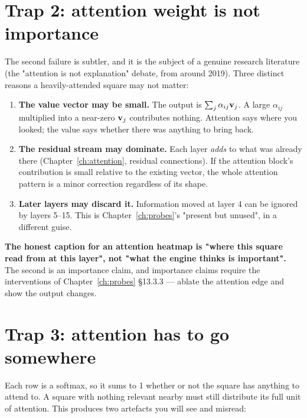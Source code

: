 \section{Trap 2: attention weight is not importance}

The second failure is subtler, and it is the subject of a genuine research literature
(the "attention is not explanation" debate, from around 2019). Three distinct reasons a
heavily-attended square may not matter:

\begin{enumerate}
\item \textbf{The value vector may be small.} The output is $\sum_j \alpha_{ij}\mathbf{v}_j$. A
  large $\alpha_{ij}$ multiplied into a near-zero $\mathbf{v}_j$ contributes nothing. Attention
  says where you looked; the value says whether there was anything to bring back.
\item \textbf{The residual stream may dominate.} Each layer \emph{adds} to what was already
  there (Chapter~\ref{ch:attention}, residual connections). If the attention block's
  contribution is small relative to the existing vector, the whole attention pattern is a
  minor correction regardless of its shape.
\item \textbf{Later layers may discard it.} Information moved at layer 4 can be ignored by
  layers 5--15. This is Chapter~\ref{ch:probes}'s "present but unused", in a different guise.
\end{enumerate}

\begin{keyidea}
\textbf{The honest caption for an attention heatmap is "where this square read from at this
layer", not "what the engine thinks is important".} The second is an importance claim, and
importance claims require the interventions of Chapter~\ref{ch:probes} §13.3.3 --- ablate the
attention edge and show the output changes.
\end{keyidea}

\section{Trap 3: attention has to go somewhere}

Each row is a softmax, so it sums to 1 whether or not the square has anything to attend to. A
square with nothing relevant nearby must still distribute its full unit of attention. This
produces two artefacts you will see and misread:

